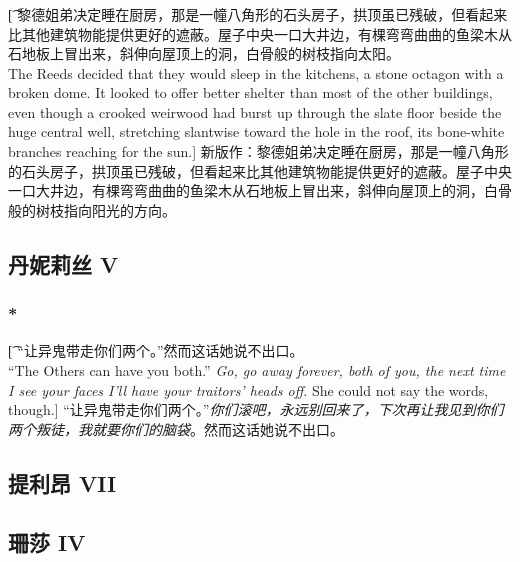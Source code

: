 \documentclass[12pt,a4paper]{article}
\begin{document}
\subsubsection{}\t[
	黎德姐弟决定睡在厨房，那是一幢八角形的石头房子，拱顶虽已残破，但看起来比其他建筑物能提供更好的遮蔽。屋子中央一口大井边，有棵弯弯曲曲的鱼梁木从石地板上冒出来，斜伸向屋顶上的洞，白骨般的树枝指向太阳。\\
	The Reeds decided that they would sleep in the kitchens, a stone octagon with a broken dome. It looked to offer better shelter than most of the other buildings, even though a crooked weirwood had burst up through the slate floor beside the huge central well, stretching slantwise toward the hole in the roof, its bone-white branches reaching for the sun.]
	新版作：黎德姐弟决定睡在厨房，那是一幢八角形的石头房子，拱顶虽已残破，但看起来比其他建筑物能提供更好的遮蔽。屋子中央一口大井边，有棵弯弯曲曲的鱼梁木从石地板上冒出来，斜伸向屋顶上的洞，白骨般的树枝指向阳光的方向。
	
\subsection{丹妮莉丝 V}
\subsubsection{\color{red}*}\t[
	“让异鬼带走你们两个。”然而这话她说不出口。\\
	“The Others can have you both.” \emph{Go, go away forever, both of you, the next time I see your faces I'll have your traitors' heads off}. She could not say the words, though.]
	“让异鬼带走你们两个。”\emph{你们滚吧，永远别回来了，下次再让我见到你们两个叛徒，我就要你们的脑袋}。然而这话她说不出口。
	
\subsection{提利昂 VII}

	
\subsection{珊莎 IV}
\end{document}
